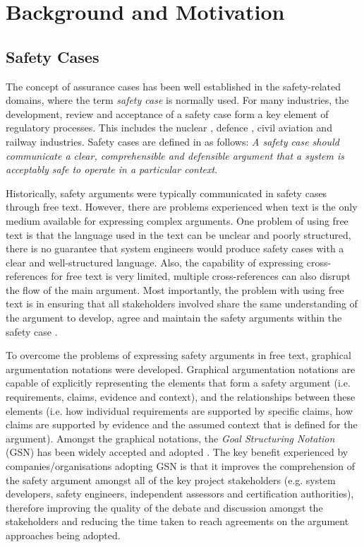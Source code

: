 \section{Background and Motivation}
\label{sec:background}

\subsection{Safety Cases}
The concept of assurance cases has been well established in the safety-related domains, where the term \textit{safety case} is normally used. 
For many industries, the development, review and acceptance of a safety case form a key element of regulatory processes. 
This includes the nuclear \cite{hse}, defence \cite{mod2007}, civil aviation \cite{caa2007} and railway \cite{yellowBook2007} industries. 
Safety cases are defined in \cite{kelly2004goal} as follows: \textit{A safety case should communicate a clear, comprehensible and defensible argument that a system is acceptably safe to operate in a particular context}. 

Historically, safety arguments were typically communicated in safety cases through free text. However, there are problems experienced when text is the only medium available for expressing complex arguments. 
One problem of using free text is that the language used in the text can be unclear and poorly structured, there is no guarantee that system engineers would produce safety cases with a clear and well-structured language. 
Also, the capability of expressing cross-references for free text is very limited, multiple cross-references can also disrupt the flow of the main argument. 
Most importantly, the problem with using free text is in ensuring that all stakeholders involved share the same understanding of the argument to develop, agree and maintain the safety arguments within the safety case \cite{kelly2004goal}.

To overcome the problems of expressing safety arguments in free text, graphical argumentation notations were developed. 
Graphical argumentation notations are capable of explicitly representing the elements that form a safety argument (i.e. requirements, claims, evidence and context), and the relationships between these elements (i.e. how individual requirements are supported by specific claims, how claims are supported by evidence and the assumed context that is defined for the argument). 
Amongst the graphical notations, the \textit{Goal Structuring Notation} (GSN) \cite{kelly2004goal} has been widely accepted and adopted \cite{chinneck2004turning}. 
The key benefit experienced by companies/organisations adopting GSN is that it improves the comprehension of the safety argument amongst all of the key project stakeholders (e.g. system developers, safety engineers, independent assessors and certification authorities), therefore improving the quality of the debate and discussion amongst the stakeholders and reducing the time taken to reach agreements on the argument approaches being adopted.

